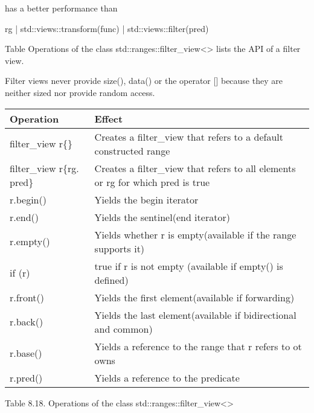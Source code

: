 has a better performance than

\begin{cpp}
rg | std::views::transform(func) | std::views::filter(pred)
\end{cpp}


Table Operations of the class std::ranges::filter\_view<> lists the API of a filter view.

Filter views never provide size(), data() or the operator [] because they are neither sized nor provide random access.

\begin{longtable}[c]{|l|l|}
\hline
\textbf{Operation} & \textbf{Effect}                                                \\ \hline
\endfirsthead
%
\endhead
%
filter\_view r\{\}         & Creates a filter\_view that refers to a default constructed range               \\ \hline
filter\_view r\{rg. pred\} & Creates a filter\_view that refers to all elements or rg for which pred is true \\ \hline
r.begin()          & Yields the begin iterator                                      \\ \hline
r.end()            & Yields the sentinel(end iterator)                              \\ \hline
r.empty()          & Yields whether r is empty(available if the range supports it)  \\ \hline
if (r)             & true if r is not empty (available if empty() is defined)       \\ \hline
r.front()          & Yields the first element(available if forwarding)              \\ \hline
r.back()           & Yields the last element(available if bidirectional and common) \\ \hline
r.base()           & Yields a reference to the range that r refers to ot owns       \\ \hline
r.pred()           & Yields a reference to the predicate                            \\ \hline
\end{longtable}

\begin{center}
Table 8.18. Operations of the class std::ranges::filter\_view<>
\end{center}
